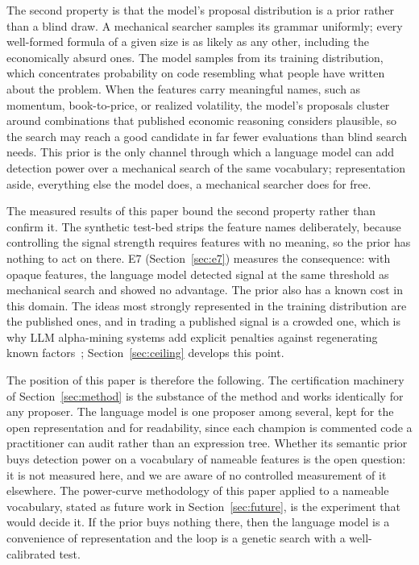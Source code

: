 \documentclass[11pt]{article}
\begin{document}
The second property is that the model's proposal distribution is a prior rather than a blind draw. A
mechanical searcher samples its grammar uniformly; every well-formed formula of a given size is as
likely as any other, including the economically absurd ones. The model samples from its training
distribution, which concentrates probability on code resembling what people have written about the
problem. When the features carry meaningful names, such as momentum, book-to-price, or realized
volatility, the model's proposals cluster around combinations that published economic reasoning
considers plausible, so the search may reach a good candidate in far fewer evaluations than blind
search needs. This prior is the only channel through which a language model can add detection power
over a mechanical search of the same vocabulary; representation aside, everything else the model does,
a mechanical searcher does for free.

The measured results of this paper bound the second property rather than confirm it. The synthetic
test-bed strips the feature names deliberately, because controlling the signal strength requires
features with no meaning, so the prior has nothing to act on there. E7 (Section~\ref{sec:e7}) measures
the consequence: with opaque features, the language model detected signal at the same threshold as
mechanical search and showed no advantage. The prior also has a known cost in this domain. The ideas
most strongly represented in the training distribution are the published ones, and in trading a
published signal is a crowded one, which is why LLM alpha-mining systems add explicit penalties against
regenerating known factors~\cite{alphaagent}; Section~\ref{sec:ceiling} develops this point.

The position of this paper is therefore the following. The certification machinery of
Section~\ref{sec:method} is the substance of the method and works identically for any proposer. The
language model is one proposer among several, kept for the open representation and for readability,
since each champion is commented code a practitioner can audit rather than an expression tree. Whether
its semantic prior buys detection power on a vocabulary of nameable features is the open question: it
is not measured here, and we are aware of no controlled measurement of it elsewhere. The power-curve
methodology of this paper applied to a nameable vocabulary, stated as future work in
Section~\ref{sec:future}, is the experiment that would decide it. If the prior buys nothing there, then the language model is a convenience of representation and the
loop is a genetic search with a well-calibrated test.
\end{document}
